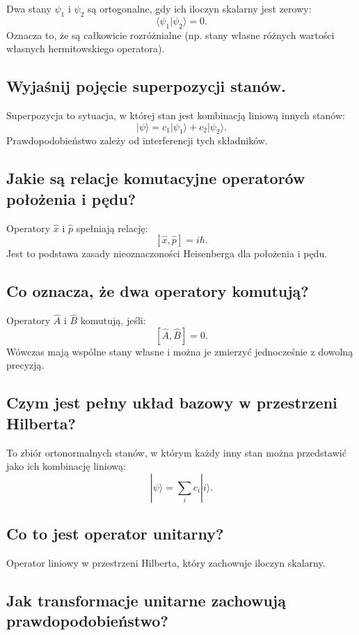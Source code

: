 Dwa stany $\psi_1$ i $\psi_2$ są ortogonalne, gdy ich iloczyn skalarny jest zerowy:
\[
\langle \psi_1 | \psi_2 \rangle = 0.
\]
Oznacza to, że są całkowicie rozróżnialne (np. stany własne różnych wartości własnych hermitowskiego operatora).

\subsection{Wyjaśnij pojęcie superpozycji stanów.}

Superpozycja to sytuacja, w której stan jest kombinacją liniową innych stanów:
\[
|\psi\rangle = c_1|\psi_1\rangle + c_2|\psi_2\rangle.
\]
Prawdopodobieństwo zależy od interferencji tych składników.


\subsection{Jakie są relacje komutacyjne operatorów położenia i pędu?}

Operatory $\hat{x}$ i $\hat{p}$ spełniają relację:
\[
[\hat{x}, \hat{p}] = i\hbar.
\]
Jest to podstawa zasady nieoznaczoności Heisenberga dla położenia i pędu.

\subsection{Co oznacza, że dwa operatory komutują?}

Operatory $\hat{A}$ i $\hat{B}$ komutują, jeśli:
\[
[\hat{A}, \hat{B}] = 0.
\]
Wówczas mają wspólne stany własne i można je zmierzyć jednocześnie z dowolną precyzją.

\subsection{Czym jest pełny układ bazowy w przestrzeni Hilberta?}

To zbiór ortonormalnych stanów, w którym każdy inny stan można przedstawić jako ich kombinację liniową:
\[
|\psi\rangle = \sum_i c_i |i\rangle.
\]

\subsection{Co to jest operator unitarny?}

Operator liniowy w przestrzeni Hilberta, który zachowuje iloczyn skalarny.

\subsection{Jak transformacje unitarne zachowują prawdopodobieństwo?}

